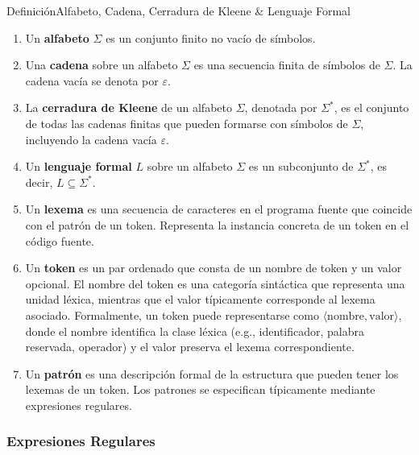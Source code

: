 \documentclass[10pt]{book}
\begin{document}
\begin{definition}[]{Definición}{Alfabeto, Cadena, Cerradura de Kleene \& Lenguaje Formal}

  \begin{enumerate}

\item Un \textbf{alfabeto} $\Sigma$ es un conjunto finito no vacío de símbolos.


\item Una \textbf{cadena} sobre un alfabeto $\Sigma$ es una secuencia finita de símbolos de $\Sigma$. La cadena vacía se denota por $\varepsilon$.

\item La \textbf{cerradura de Kleene} de un alfabeto $\Sigma$, denotada por $\Sigma^*$, es el conjunto de todas las cadenas finitas que pueden formarse con símbolos de $\Sigma$, incluyendo la cadena vacía $\varepsilon$.

\item Un \textbf{lenguaje formal} $L$ sobre un alfabeto $\Sigma$ es un subconjunto de $\Sigma^*$, es decir, $L \subseteq \Sigma^*$.

\item Un \textbf{lexema} es una secuencia de caracteres en el programa fuente que coincide con el patrón de un token. Representa la instancia concreta de un token en el código fuente.

\item Un \textbf{token} es un par ordenado que consta de un nombre de token y un valor opcional. El nombre del token es una categoría sintáctica que representa una unidad léxica, mientras que el valor típicamente corresponde al lexema asociado. Formalmente, un token puede representarse como $\langle \text{nombre}, \text{valor} \rangle$, donde el nombre identifica la clase léxica (e.g., identificador, palabra reservada, operador) y el valor preserva el lexema correspondiente.

\item Un \textbf{patrón} es una descripción formal de la estructura que pueden tener los lexemas de un token. Los patrones se especifican típicamente mediante expresiones regulares.
\end{enumerate}

\end{definition}

\subsubsection{Expresiones Regulares}
\end{document}
